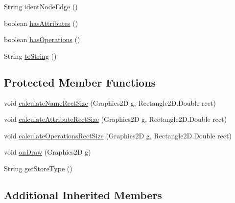 \begin{DoxyCompactItemize}
\item 
String \hyperlink{classorg_1_1tzi_1_1use_1_1gui_1_1views_1_1diagrams_1_1classdiagram_1_1_class_node_aeb3ce695d61f8f9c95334617b3103fd8}{ident\-Node\-Edge} ()
\item 
boolean \hyperlink{classorg_1_1tzi_1_1use_1_1gui_1_1views_1_1diagrams_1_1classdiagram_1_1_class_node_a6c07e23952c193c6b2d44428b77d7208}{has\-Attributes} ()
\item 
boolean \hyperlink{classorg_1_1tzi_1_1use_1_1gui_1_1views_1_1diagrams_1_1classdiagram_1_1_class_node_a5f85e539bfb671cc3ba4d558ad65206a}{has\-Operations} ()
\item 
String \hyperlink{classorg_1_1tzi_1_1use_1_1gui_1_1views_1_1diagrams_1_1classdiagram_1_1_class_node_ae7202f75b67b6249d8f9e9f3cbbed1a4}{to\-String} ()
\end{DoxyCompactItemize}
\subsection*{Protected Member Functions}
\begin{DoxyCompactItemize}
\item 
void \hyperlink{classorg_1_1tzi_1_1use_1_1gui_1_1views_1_1diagrams_1_1classdiagram_1_1_class_node_abaff8568683b410c601ab637a36cfb9b}{calculate\-Name\-Rect\-Size} (Graphics2\-D g, Rectangle2\-D.\-Double rect)
\item 
void \hyperlink{classorg_1_1tzi_1_1use_1_1gui_1_1views_1_1diagrams_1_1classdiagram_1_1_class_node_a6e287e1bec726c6a8c5f88a54eed7751}{calculate\-Attribute\-Rect\-Size} (Graphics2\-D g, Rectangle2\-D.\-Double rect)
\item 
void \hyperlink{classorg_1_1tzi_1_1use_1_1gui_1_1views_1_1diagrams_1_1classdiagram_1_1_class_node_ae05b77e7854fa78107b49a83d0588f20}{calculate\-Operations\-Rect\-Size} (Graphics2\-D g, Rectangle2\-D.\-Double rect)
\item 
void \hyperlink{classorg_1_1tzi_1_1use_1_1gui_1_1views_1_1diagrams_1_1classdiagram_1_1_class_node_a56c95f4941584aa35f884ec3ed36121b}{on\-Draw} (Graphics2\-D g)
\item 
String \hyperlink{classorg_1_1tzi_1_1use_1_1gui_1_1views_1_1diagrams_1_1classdiagram_1_1_class_node_a08b33affa9f073b90b208c91d9be0917}{get\-Store\-Type} ()
\end{DoxyCompactItemize}
\subsection*{Additional Inherited Members}


